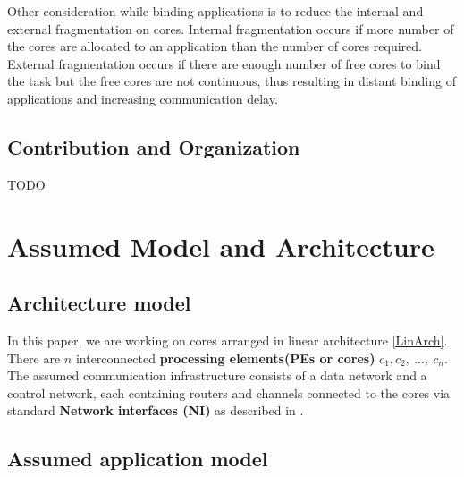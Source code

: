 \documentclass[10pt, conference]{IEEEtran}
\begin{document}
Other consideration while binding applications is to reduce the internal and external fragmentation on cores. Internal fragmentation occurs if more number of the cores are allocated to an application than the number of cores required. External fragmentation occurs if there are enough number of free cores to bind the task but the free cores are not continuous, thus resulting in distant binding of applications and increasing communication delay.

\subsection{Contribution and Organization}
TODO


\section{Assumed Model and  Architecture} 

\subsection{Architecture model}


In this paper, we are working on cores arranged in linear architecture \ref{LinArch}. There are $n$ interconnected {\bf processing elements(PEs or cores)} $c_1,c_2,\:...,\:c_{n}$. The assumed communication infrastructure consists of a data network and a control network, each containing routers and channels connected to the cores via standard {\bf Network interfaces (NI)} as described in \cite{paper14}.  

\subsection{Assumed application model}
\end{document}
